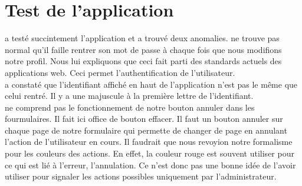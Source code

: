\documentclass [a4paper] {article}
\begin{document}
\section{Test de l'application}
\nomTuteurPedago{} a testé succintement l'application et a trouvé deux anomalies. \nomTuteurPedago{} ne trouve pas normal qu'il faille rentrer son mot de passe à chaque fois que nous modifions notre profil. Nous lui expliquons que ceci fait parti des standards actuels des applications web. Ceci permet l'authentification de l'utilisateur.\\
\nomTuteurPedago{} a constaté que l'identifiant affiché en haut de l'application n'est pas le même que celui rentré. Il y a une majuscule à la première lettre de l'identifiant.\\
\nomTuteurPedago{} ne comprend pas le fonctionnement de notre bouton annuler dans les fourmulaires. Il fait ici office de bouton effacer.
Il faut un bouton annuler sur chaque page de notre formulaire qui permette de changer de page en annulant l'action de l'utilisateur en cours.
Il faudrait que nous revoyion notre formalisme pour les couleurs des actions. En effet, la couleur rouge est souvent utiliser pour ce qui est lié à l'erreur, l'annulation. Ce n'est donc pas une bonne idée de l'avoir utiliser pour signaler les actions possibles uniquement par l'administrateur.
\newpage
\end{document}
